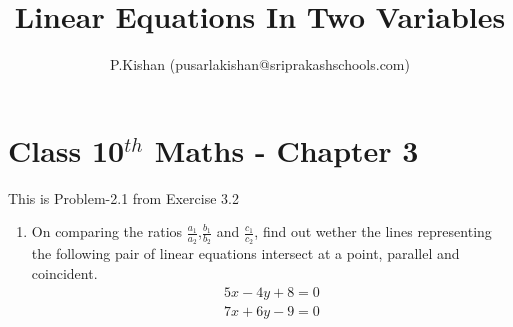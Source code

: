 \documentclass[10pt]{article}
\title{Linear Equations In Two Variables}
\author{P.Kishan (pusarlakishan@sriprakashschools.com)}
\begin{document}
\maketitle
\section*{Class 10$^{th}$ Maths - Chapter 3}
This is Problem-2.1 from Exercise 3.2
\begin{enumerate}
\item On comparing the ratios $\frac{a_1}{a_2}$,$\frac{b_1}{b_2}$ and $\frac{c_1}{c_2}$, find out wether the lines representing the following pair of linear equations intersect at a point, parallel and coincident.\\
\begin{align} 
5x-4y+8=0\\
7x+6y-9=0
\end{align}
\end{enumerate}
\end{document}
